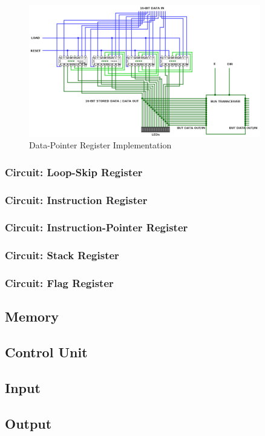 \begin{figure}[H]
	\centering
	\includegraphics[width=0.9\textwidth]{img/data_pointer_register_implementation}
	\caption{Data-Pointer Register Implementation}
	\label{fig:dataPointerRegisterImplementation}
\end{figure}

\subsubsection{Circuit: Loop-Skip Register}

\subsubsection{Circuit: Instruction Register}

\subsubsection{Circuit: Instruction-Pointer Register}

\subsubsection{Circuit: Stack Register}

\subsubsection{Circuit: Flag Register}



\subsection{Memory}
\subsection{Control Unit}
\subsection{Input}
\subsection{Output}

